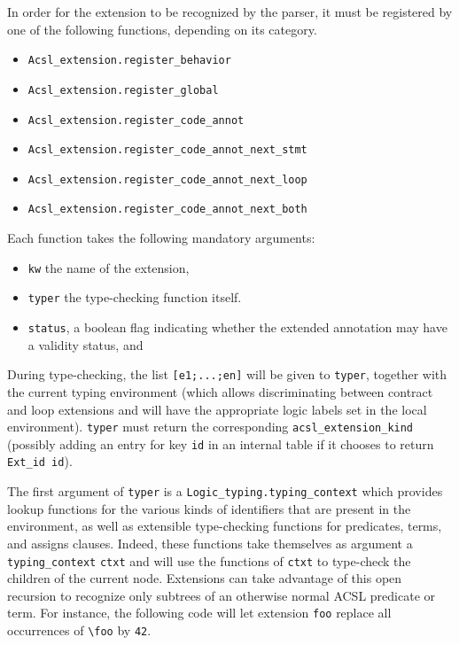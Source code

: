 In order for the extension to be recognized by the parser, it must be
registered by one of the following functions, depending on its category.
\begin{itemize}
\item \texttt{Acsl\_extension.register\_behavior}%
\item \texttt{Acsl\_extension.register\_global}%
\item \texttt{Acsl\_extension.register\_code\_annot}%
\item \texttt{Acsl\_extension.register\_code\_annot\_next\_stmt}%
\item \texttt{Acsl\_extension.register\_code\_annot\_next\_loop}%
\item \texttt{Acsl\_extension.register\_code\_annot\_next\_both}%
\end{itemize}

Each function takes the following mandatory arguments:
\begin{itemize}
\item \texttt{kw} the name of the extension,
\item \texttt{typer} the type-checking function itself.
\item \texttt{status}, a boolean flag indicating whether the extended
  annotation may have a validity status, and

\end{itemize}

During type-checking, the list \verb|[e1;...;en]| will be given to \verb|typer|,
together with the current typing environment (which allows discriminating
between contract and loop extensions and will have the appropriate logic labels
set in the local environment). \verb|typer| must return the corresponding
\verb|acsl_extension_kind| (possibly adding an entry for key \verb|id|
in an internal table if it chooses to return \verb|Ext_id id|).

The first argument of \verb|typer| is a \verb|Logic_typing.typing_context|%
 which provides lookup functions for the
various kinds of identifiers that are present in the environment, as well as
extensible type-checking functions for predicates, terms, and assigns clauses.
Indeed, these functions take themselves as argument a \verb|typing_context|
\verb|ctxt| and will use the functions of \verb|ctxt| to type-check the children
of the current node. Extensions can take advantage of this open recursion to
recognize only subtrees of an otherwise normal ACSL predicate or term. For
instance, the following code will let extension \verb|foo| replace all
occurrences of \verb|\foo| by \verb|42|.

